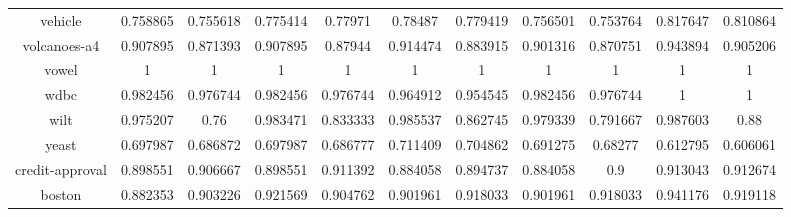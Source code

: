 \documentclass[review]{elsarticle}
\begin{document}
\begin{table}[htbp]
{\begin{tabular}{ccccccccccc}
		vehicle                          & 0.758865             & 0.755618            & 0.775414  & 0.77971  & 0.78487           & 0.779419         & 0.756501   & 0.753764  & 0.817647  & 0.810864  \\
		volcanoes-a4                     & 0.907895             & 0.871393            & 0.907895  & 0.87944  & 0.914474          & 0.883915         & 0.901316   & 0.870751  & 0.943894  & 0.905206  \\
		vowel                            & 1                    & 1                   & 1         & 1        & 1                 & 1                & 1          & 1         & 1         & 1         \\
		wdbc                             & 0.982456             & 0.976744            & 0.982456  & 0.976744 & 0.964912          & 0.954545         & 0.982456   & 0.976744  & 1         & 1         \\
		wilt                             & 0.975207             & 0.76                & 0.983471  & 0.833333 & 0.985537          & 0.862745         & 0.979339   & 0.791667  & 0.987603  & 0.88      \\
		yeast                            & 0.697987             & 0.686872            & 0.697987  & 0.686777 & 0.711409          & 0.704862         & 0.691275   & 0.68277   & 0.612795  & 0.606061  \\
		credit-approval                  & 0.898551             & 0.906667            & 0.898551  & 0.911392 & 0.884058          & 0.894737         & 0.884058   & 0.9       & 0.913043  & 0.912674  \\
		boston                           & 0.882353             & 0.903226            & 0.921569  & 0.904762 & 0.901961          & 0.918033         & 0.901961   & 0.918033  & 0.941176  & 0.919118  \\
		\bottomrule
	\end{tabular}}
\end{table}
\end{document}
